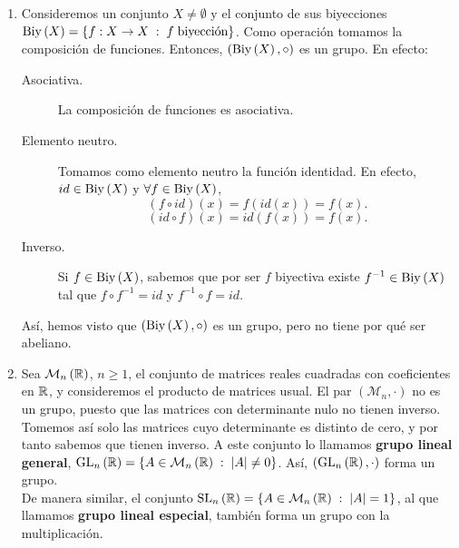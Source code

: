 \begin{eg}
\begin{enumerate}
	\item Consideremos un conjunto $\displaystyle X \neq \emptyset $ y el conjunto de sus biyecciones $\displaystyle \operatorname{Biy}\left(X\right) = \left\{ f : X \to X \; : \; f \; \text{biyección}\right\}  $. Como operación tomamos la composición de funciones. Entonces, $\displaystyle \left(\operatorname{Biy}\left(X\right), \circ\right) $ es un grupo. En efecto:
		\begin{description}
		\item[Asociativa.] La composición de funciones es asociativa.
		\item[Elemento neutro.] Tomamos como elemento neutro la función identidad. En efecto, $\displaystyle id \in \operatorname{Biy}\left(X\right) $ y $\displaystyle \forall f \in \operatorname{Biy}\left(X\right) $, 
			\[\left(f\circ id \right)\left(x\right) = f\left(id \left(x\right)\right) = f\left(x\right) .\]
		\[\left(id \circ f\right)\left(x\right) = id \left(f\left(x\right)\right) = f\left(x\right) .\]
	\item[Inverso.]	Si $\displaystyle f \in \operatorname{Biy}\left(X\right) $, sabemos que por ser $\displaystyle f $ biyectiva existe $\displaystyle f^{-1} \in \operatorname{Biy}\left(X\right) $ tal que $\displaystyle f \circ f^{-1} = id $ y $\displaystyle f^{-1} \circ f = id $. 
		\end{description}
	Así, hemos visto que $\displaystyle \left(\operatorname{Biy}\left(X\right), \circ\right) $ es un grupo, pero no tiene por qué ser abeliano.
\item Sea $\displaystyle \mathcal{M}_{n}\left(\mathbb{R}\right) $, $\displaystyle n \geq 1 $, el conjunto de matrices reales cuadradas con coeficientes en $\displaystyle \mathbb{R} $, y consideremos el producto de matrices usual. El par $\displaystyle \left(\mathcal{M}_{n}, \cdot\right) $ no es un grupo, puesto que las matrices con determinante nulo no tienen inverso. \\ 
	Tomemos así solo las matrices cuyo determinante es distinto de cero, y por tanto sabemos que tienen inverso. A este conjunto lo llamamos \textbf{grupo lineal general}, $\displaystyle \operatorname{GL}_{n}\left(\mathbb{R}\right) = \left\{ A \in \mathcal{M}_{n}\left(\mathbb{R}\right) \; : \; \left|A\right| \neq 0\right\}  $. Así, $\displaystyle \left(\operatorname{GL}_{n}\left(\mathbb{R}\right), \cdot\right) $ forma un grupo. \\
	De manera similar, el conjunto $\displaystyle \operatorname{SL}_{n}\left(\mathbb{R}\right) = \left\{ A \in \mathcal{M}_{n}\left(\mathbb{R}\right) \; : \; \left|A\right| = 1\right\}  $, al que llamamos \textbf{grupo lineal especial}, también forma un grupo con la multiplicación. 
\end{enumerate}
\end{eg}
